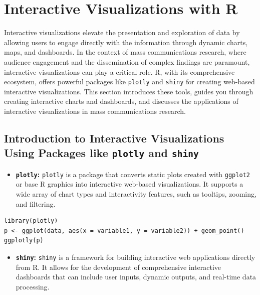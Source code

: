 \documentclass[
]{book}
\providecommand{\tightlist}{%
  \setlength{\itemsep}{0pt}\setlength{\parskip}{0pt}}
\begin{document}
\hypertarget{interactive-visualizations-with-r}{%
\section{Interactive Visualizations with R}\label{interactive-visualizations-with-r}}

Interactive visualizations elevate the presentation and exploration of data by allowing users to engage directly with the information through dynamic charts, maps, and dashboards. In the context of mass communications research, where audience engagement and the dissemination of complex findings are paramount, interactive visualizations can play a critical role. R, with its comprehensive ecosystem, offers powerful packages like \texttt{plotly} and \texttt{shiny} for creating web-based interactive visualizations. This section introduces these tools, guides you through creating interactive charts and dashboards, and discusses the applications of interactive visualizations in mass communications research.

\hypertarget{introduction-to-interactive-visualizations-using-packages-like-plotly-and-shiny}{%
\subsection{\texorpdfstring{Introduction to Interactive Visualizations Using Packages like \texttt{plotly} and \texttt{shiny}}{Introduction to Interactive Visualizations Using Packages like plotly and shiny}}\label{introduction-to-interactive-visualizations-using-packages-like-plotly-and-shiny}}

\begin{itemize}
\tightlist
\item
  \textbf{\texttt{plotly}:} \texttt{plotly} is a package that converts static plots created with \texttt{ggplot2} or base R graphics into interactive web-based visualizations. It supports a wide array of chart types and interactivity features, such as tooltips, zooming, and filtering.
\end{itemize}

\begin{verbatim}
library(plotly)
p <- ggplot(data, aes(x = variable1, y = variable2)) + geom_point()
ggplotly(p)
\end{verbatim}

\begin{itemize}
\tightlist
\item
  \textbf{\texttt{shiny}:} \texttt{shiny} is a framework for building interactive web applications directly from R. It allows for the development of comprehensive interactive dashboards that can include user inputs, dynamic outputs, and real-time data processing.
\end{itemize}
\end{document}
